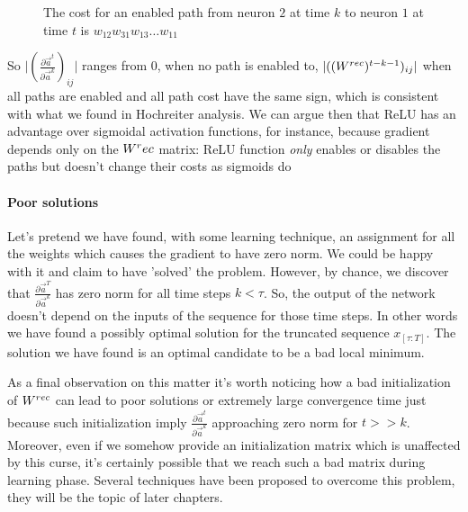 \begin{figure}
\caption{The cost for an enabled path from neuron $2$ at time $k$ to neuron $1$ at time $t$ is $w_{12}w_{31}w_{13}\hdots w_{11}$ }
\label{gradient_path_cost_relu}
\end{figure}

So $\vert (\frac{\partial \vec{a}^t}{\partial \vec{a}^k})_{ij}\vert$ ranges from 0, when no path is enabled to, $\vert ((W^{rec})^{t-k-1})_{ij} \vert$ when all
paths are enabled and all path cost have the same sign, which is consistent with what we found in Hochreiter analysis.
We can argue then that ReLU has an advantage over sigmoidal activation functions, for instance, because gradient depends only on the $W^rec$ matrix:
ReLU function \textit{only} enables or disables the paths but doesn't change their costs as sigmoids do


\paragraph{Poor solutions}
Let's pretend we have found, with some learning technique, an assignment for all the weights which causes the gradient to have zero norm. We could be happy with
it and claim to have 'solved' the problem. However, by chance, we discover that $\frac{\partial \vec{a}^T}{\partial \vec{a}^k}$ has zero norm for all
time steps $k<\tau$. So, the output of the network doesn't depend on the inputs of the sequence for those time steps.
In other words we have found a possibly optimal solution for the truncated sequence ${x}_{[\tau:T]}$. The solution we have found is an optimal candidate to
be a bad local minimum.

As a final observation on this matter it's worth noticing how a bad initialization of $W^{rec}$ can lead to poor solutions or extremely large convergence time
just because such initialization imply $\frac{\partial \vec{a}^t}{\partial \vec{a}^k}$ approaching zero norm for $t>>k$. Moreover, even if we somehow provide
an initialization matrix which is unaffected by this curse, it's certainly possible that we reach such a bad matrix during learning phase.
Several techniques have been proposed to overcome this problem, they will be the topic of later chapters.





